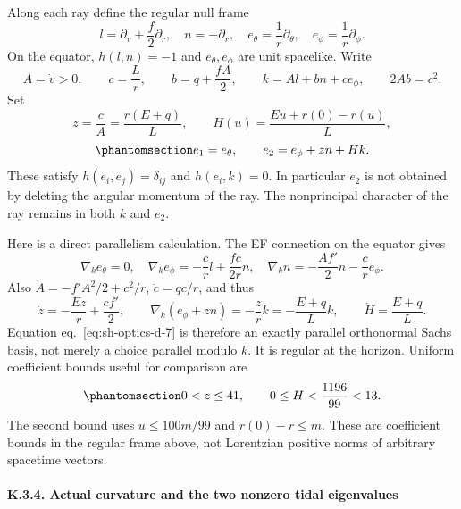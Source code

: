 \documentclass[
  english,
  11pt,
  reqno]{amsart}
\begin{document}
Along each ray define the regular null frame \[
 l=\partial_v+\frac f2\partial_r,\quad n=-\partial_r,
 \quad e_\theta=\frac1r\partial_\theta,\quad
 e_\phi=\frac1r\partial_\phi.
\] On the equator, \(h(l,n)=-1\) and \(e_\theta,e_\phi\) are unit
spacelike. Write \[
 A=\dot v>0,\qquad c=\frac Lr,\qquad
 b=q+\frac{fA}{2},\qquad
 k=A l+b n+c e_\phi,\qquad 2Ab=c^2.
\] Set \[
 z=\frac cA=\frac{r(E+q)}L,\qquad
 H(u)=\frac{Eu+r(0)-r(u)}L,
\] \begin{equation}\protect\phantomsection\label{eq:sh-optics-d-7}{
 e_1=e_\theta,\qquad e_2=e_\phi+z n+Hk.
}\end{equation} These satisfy \(h(e_i,e_j)=\delta_{ij}\) and
\(h(e_i,k)=0\). In particular \(e_2\) is not obtained by deleting the
angular momentum of the ray. The nonprincipal character of the ray
remains in both \(k\) and \(e_2\).

Here is a direct parallelism calculation. The EF connection on the
equator gives \[
 \nabla_k e_\theta=0,\quad
 \nabla_k e_\phi=-\frac crl+\frac{fc}{2r}n,\quad
 \nabla_k n=-\frac{Af'}2 n-\frac cr e_\phi.
\] Also \(\dot A=-f'A^2/2+c^2/r\), \(\dot c=qc/r\), and thus \[
 \dot z=-\frac{Ez}{r}+\frac{cf'}2,\qquad
 \nabla_k(e_\phi+z n)=-\frac zr k=-\frac{E+q}L k,
 \qquad \dot H=\frac{E+q}L.
\] Equation eq.~\ref{eq:sh-optics-d-7} is therefore an exactly parallel
orthonormal Sachs basis, not merely a choice parallel modulo \(k\). It
is regular at the horizon. Uniform coefficient bounds useful for
comparison are
\begin{equation}\protect\phantomsection\label{eq:sh-optics-d-8}{
 0<z\le41,\qquad 0\le H<\frac{1196}{99}<13.
}\end{equation} The second bound uses \(u\le100m/99\) and
\(r(0)-r\le m\). These are coefficient bounds in the regular frame
above, not Lorentzian positive norms of arbitrary spacetime vectors.

\protect{}\label{sec:sh-optics-4}

\paragraph{K.3.4. Actual curvature and the two nonzero tidal
eigenvalues}\label{k.3.4.-actual-curvature-and-the-two-nonzero-tidal-eigenvalues}
\end{document}
